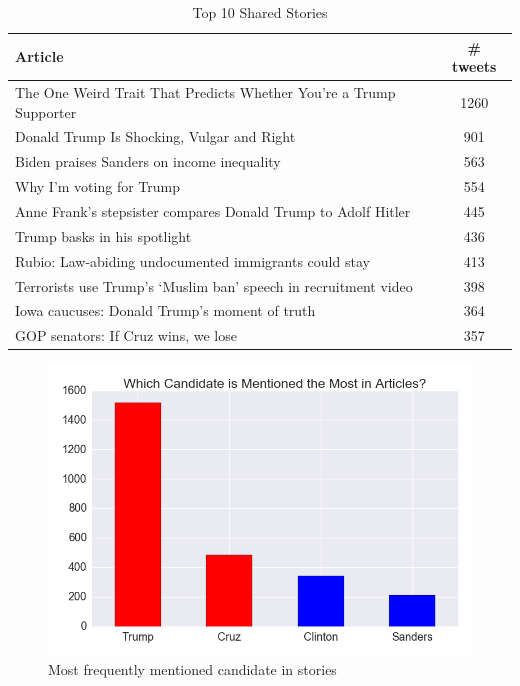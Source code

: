 \documentclass[letterpaper]{article}
\begin{document}
 
\begin{table}
\begin{tabular}{ |l c| } 
    \hline
    Article &  \# tweets \\
    \hline
    The One Weird Trait That Predicts Whether You're a Trump Supporter &   1260 \\
    Donald Trump Is Shocking, Vulgar and Right                         &    901 \\
    Biden praises Sanders on income inequality                         &    563 \\
    Why I'm voting for Trump                                           &    554 \\
    Anne Frank's stepsister compares Donald Trump to Adolf Hitler      &    445 \\
    Trump basks in his spotlight                                       &    436 \\
    Rubio: Law-abiding undocumented immigrants could stay              &    413 \\
    Terrorists use Trump's `Muslim ban' speech in recruitment video    &    398 \\
    Iowa caucuses: Donald Trump's moment of truth                      &    364 \\
    GOP senators: If Cruz wins, we lose                                &    357 \\
    \hline
\end{tabular}
\caption{\label{tab:top-10}Top 10 Shared Stories}
\end{table}

\begin{figure}[t!]  
\centering 
  \includegraphics[width=\columnwidth]{candidate-mentions}  
  \caption{Most frequently mentioned candidate in stories
    \label{fig:tweets-by-pub}}
\end{figure} 
\end{document}
